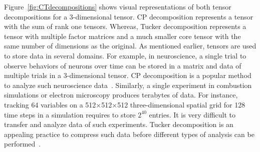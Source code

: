 \documentclass[a4paper,11pt, margin=2cm]{article}
\newcommand{\bora}[1]{{\color{magenta} \emph{#1}}}
\begin{document}
	Figure~\ref{fig:CTdecompositions} shows visual representations of both tensor decompositions for a 3-dimensional tensor. CP decomposition represents a tensor with the sum of rank one tensors. Whereas, Tucker decomposition represents a tensor with multiple factor matrices and a much smaller core tensor with the same number of dimensions as the original.
	As mentioned earlier, tensors are used to store data in several domains. For example, in neuroscience, a single trial to observe behaviors of neurons over time can be stored in a matrix and data of multiple trials in a 3-dimensional tensor. CP decomposition is a popular method to analyze such neuroscience data~\cite{WKV-Neuron-2018}.
	Similarly, a single experiment in combustion simulations or electron microscopy produces terabytes of data. For instance, tracking 64 variables on a 512$\times$512$\times$512 three-dimensional spatial grid for 128 time steps in a simulation requires to store $2^{40}$ entries. It is very difficult to transfer and analyze data of such experiments. Tucker decomposition is an appealing practice to compress such data before different types of analysis can be performed~\cite{ABK-IPDPS-2016}.
	
	
	
	
	
	
	
	
\end{document}
